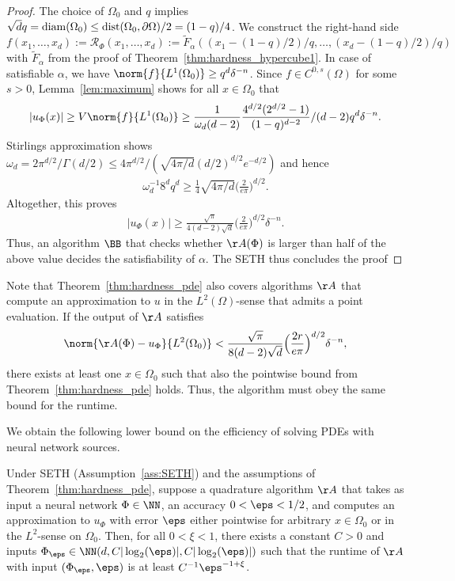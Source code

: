 \documentclass{amsart}[11pt]
\numberwithin{equation}{section}
\newcommand{\realization}{\mathcal{R}}
\numberwithin{theorem}{section}
\begin{document}
    \begin{proof}
        The choice of $\Omega_0$ and $q$ implies $\sqrt{d}q={\rm diam}(\Omega_0)\leq {\rm dist}(\Omega_0,\partial\Omega)/2= (1-q)/4$.
        We construct the right-hand side $f(x_1,\ldots,x_d):=\realization_\Phi(x_1,\ldots,x_d):=\widetilde F_\alpha((x_1-(1-q)/2)/q,\ldots,(x_d-(1-q)/2)/q)$ with $\widetilde F_\alpha$ from the proof of Theorem~\ref{thm:hardness_hypercube1}. In case of satisfiable $\alpha$, we have $\norm{f}{L^1(\Omega_0)}\geq q^d \delta^{-n}$.
        Since $f\in C^{0,s}(\Omega)$ for some $s>0$, Lemma~\ref{lem:maximum} shows for all $x\in\Omega_0$ that
        \begin{align*}
        |u_\Phi(x)|\geq V\norm{f}{L^1(\Omega_0)} \geq \frac{1}{\omega_d(d-2)} \frac{4^{d/2}(2^{d/2}-1)}{(1-q)^{d-2}}/(d-2)q^{d}\delta^{-n}.
        \end{align*}
        Stirlings approximation shows $\omega_d=2\pi^{d/2}/\Gamma(d/2)\leq 4\pi^{d/2}/(\sqrt{4\pi/d}(d/2)^{d/2}e^{-d/2})$ and hence
        \begin{align*}
            \omega_d^{-1}8^d q^{d}\geq \frac{1}{4}\sqrt{4\pi/d}\Big(\frac{2}{e\pi}\Big)^{d/2}.
        \end{align*}
        Altogether, this proves
        \begin{align*}
            |u_\Phi(x)|\geq\frac{\sqrt{\pi}}{4(d-2)\sqrt{d}}\Big(\frac{2}{e\pi}\Big)^{d/2}\delta^{-n}.
        \end{align*}
        Thus, an algorithm $\BB$ that checks whether $\AA(\Phi)$ is larger than half of the above value decides the satisfiability of $\alpha$. The SETH thus concludes the proof
    \end{proof}
\begin{remark}
Note that Theorem~\ref{thm:hardness_pde} also covers algorithms $\AA$ that compute an approximation to $u$ in the $L^2(\Omega)$-sense that admits a point evaluation.
If the output of $\AA$ satisfies
\begin{align*}
    \norm{\AA(\Phi) -u_\Phi}{L^2(\Omega_0)}< 
        \frac{\sqrt{\pi}}{8(d-2)\sqrt{d}}\Big(\frac{2r}{e\pi}\Big)^{d/2}\delta^{-n},
\end{align*}
there exists at least one $x\in\Omega_0$ such that also the pointwise bound from Theorem~\ref{thm:hardness_pde} holds. Thus, the algorithm must obey the same bound for the runtime.
\end{remark}

    We obtain the following lower bound on the efficiency of solving PDEs with neural network sources.
    \begin{corollary}
        Under SETH (Assumption~\ref{ass:SETH}) and the assumptions of Theorem~\ref{thm:hardness_pde}, suppose a quadrature algorithm $\AA$ that takes as input a neural network $\Phi \in \NN$, an accuracy $0 < \eps < 1/2$, and computes an approximation to $u_\Phi$ with error $\eps$ either pointwise for arbitrary $x\in \Omega_0$ or in the $L^2$-sense on $\Omega_0$. Then, for all $0 < \xi < 1$, there exists a constant $C > 0$ and inputs $\Phi_\eps\in \NN(d,C |\log_2(\eps)|, C |\log_2(\eps)|)$ such that the runtime of $\AA$ with input $(\Phi_\eps,\eps)$ is at least $C^{-1} \eps^{-1+\xi}$.
    \end{corollary}
\end{document}
